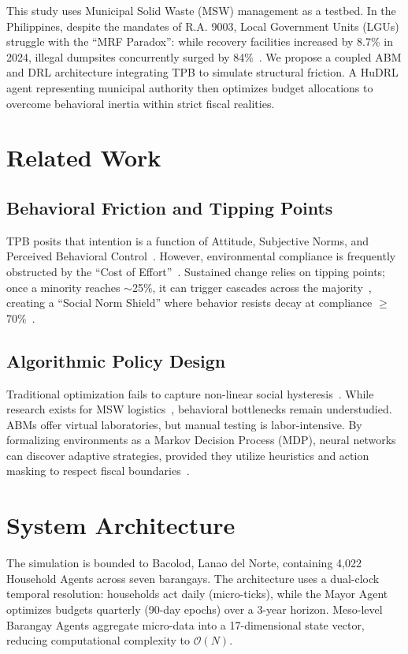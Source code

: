\documentclass[journal,a4paper]{IEEEtran}
\begin{document}
This study uses Municipal Solid Waste (MSW) management as a testbed. In the Philippines, despite the mandates of R.A. 9003, Local Government Units (LGUs) struggle with the ``MRF Paradox'': while recovery facilities increased by 8.7\% in 2024, illegal dumpsites concurrently surged by 84\%~\cite{psa2025}. We propose a coupled ABM and DRL architecture integrating TPB to simulate structural friction. A HuDRL agent representing municipal authority then optimizes budget allocations to overcome behavioral inertia within strict fiscal realities.

\section{Related Work}
\subsection{Behavioral Friction and Tipping Points}
TPB posits that intention is a function of Attitude, Subjective Norms, and Perceived Behavioral Control~\cite{taraghi2025}. However, environmental compliance is frequently obstructed by the ``Cost of Effort''~\cite{moeini2023}. Sustained change relies on tipping points; once a minority reaches $\sim$25\%, it can trigger cascades across the majority~\cite{centola2018}, creating a ``Social Norm Shield'' where behavior resists decay at compliance $\ge$70\%~\cite{andre2021}.

\subsection{Algorithmic Policy Design}
Traditional optimization fails to capture non-linear social hysteresis~\cite{tian2024}. While research exists for MSW logistics~\cite{zhang2021}, behavioral bottlenecks remain understudied. ABMs offer virtual laboratories, but manual testing is labor-intensive. By formalizing environments as a Markov Decision Process (MDP), neural networks can discover adaptive strategies, provided they utilize heuristics and action masking to respect fiscal boundaries~\cite{zheng2022b}.

\section{System Architecture}
The simulation is bounded to Bacolod, Lanao del Norte, containing 4,022 Household Agents across seven barangays. The architecture uses a dual-clock temporal resolution: households act daily (micro-ticks), while the Mayor Agent optimizes budgets quarterly (90-day epochs) over a 3-year horizon. Meso-level Barangay Agents aggregate micro-data into a 17-dimensional state vector, reducing computational complexity to $\mathcal{O}(N)$.
\end{document}
